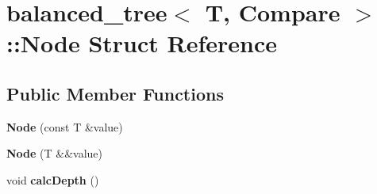 \hypertarget{structbalanced__tree_1_1Node}{\section{balanced\+\_\+tree$<$ T, Compare $>$\+:\+:Node Struct Reference}
\label{structbalanced__tree_1_1Node}
}
\subsection*{Public Member Functions}
\begin{DoxyCompactItemize}
\item 
\hypertarget{structbalanced__tree_1_1Node_abd9277485dbd23771419e51e511049d2}{{\bfseries Node} (const T \&value)}\label{structbalanced__tree_1_1Node_abd9277485dbd23771419e51e511049d2}

\item 
\hypertarget{structbalanced__tree_1_1Node_a605a5573c56bb0145f6eaee6633188a2}{{\bfseries Node} (T \&\&value)}\label{structbalanced__tree_1_1Node_a605a5573c56bb0145f6eaee6633188a2}

\item 
\hypertarget{structbalanced__tree_1_1Node_a81befdc9213a7a05239ddbf30a0572e0}{void {\bfseries calc\+Depth} ()}\label{structbalanced__tree_1_1Node_a81befdc9213a7a05239ddbf30a0572e0}

\end{DoxyCompactItemize}
